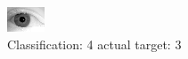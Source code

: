 \begin{figure}[h!]
\begin{center}
\includegraphics[width=0.60\columnwidth]{figures/ID2074_class_4_target_3.png}
\end{center}
\caption{ Classification: 4 actual target: 3}
\label{fig:ID2074_class_4_target_3}
\end{figure}
